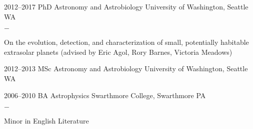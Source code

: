 \documentclass[]{luger-cv} %
\begin{document}
\begin{entrylist}


    \entry
    {2012--2017}
    {PhD {\normalfont Astronomy and Astrobiology}}
    {University of Washington, Seattle WA}
    {%
        \vspace{-1em}
        \begin{list}{{\color{numcolor}$-$}}{\cvlist}
            \item On the evolution, detection, and characterization of small, potentially habitable extrasolar planets
            (advised by Eric Agol, Rory Barnes, Victoria Meadows)
        \end{list}
    }


    \entry
    {2012--2013}
    {MSc {\normalfont Astronomy and Astrobiology}}
    {University of Washington, Seattle WA}


    \entry
    {2006--2010}
    {BA {\normalfont Astrophysics}}
    {Swarthmore College, Swarthmore PA}
    {\vspace{-1em}
        \begin{list}{{\color{numcolor}$-$}}{\cvlist}
            \item Minor in English Literature
        \end{list}}


\end{entrylist}


\end{document}
